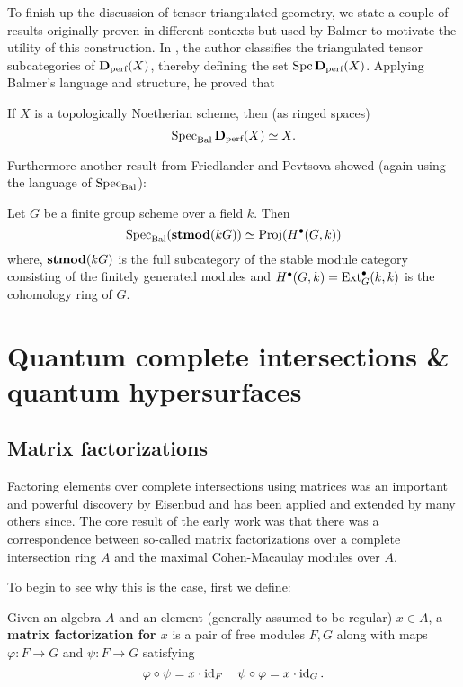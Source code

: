 \documentclass [11pt, proquest] {uwthesis}[2020/02/24]
\DeclareMathOperator{\Spc}{Spc}
\begin{document}
    To finish up the discussion of tensor-triangulated geometry, we state a couple of results originally proven in different contexts but used 
    by Balmer to motivate the utility of this construction. In \cite{thomason}, the author classifies the triangulated tensor subcategories 
    of $\mathbf{D}_{\text{perf}}(X)$, thereby defining the set $\Spc\Dperf(X)$. Applying Balmer's language and structure, he proved that 
    \begin{thm}
    	If $X$ is a topologically Noetherian scheme, then (as ringed spaces)
    	\[\operatorname{Spec}_\text{Bal}\mathbf{D}_{\text{perf}}(X)\simeq X.\]
    \end{thm}
    
    Furthermore another result from Friedlander and Pevtsova \cite{friedlander-pevtsova-pi} showed (again using 
    the language of $\operatorname{Spec}_\text{Bal}$):
    \begin{thm}
    	Let $G$ be a finite group scheme over a field $k$. Then 
    	\[\operatorname{Spec}_\text{Bal}(\operatorname{\mathbf{stmod}}(kG))\simeq\operatorname{Proj}(H^\bullet(G,k))\]
    	where, $\operatorname{\mathbf{stmod}}(kG)$ is the full subcategory of the stable module category consisting of the finitely generated modules and $H^\bullet(G,k)=\operatorname{Ext}_G^\bullet(k,k)$ is the cohomology ring of $G$.
    \end{thm}

\part{Quantum complete intersections \& quantum hypersurfaces}\label{prt:qci-qlp}

\chapter{Matrix factorizations}\label{chp:matrix-factorizations}
    Factoring elements over complete intersections using matrices was an important and powerful discovery by Eisenbud \cite{eisenbud80} and has been applied and extended by many others since. The core result of the early work was that there was a correspondence between so-called matrix factorizations over a complete intersection ring $A$ and the maximal Cohen-Macaulay modules over $A$. 
    
    To begin to see why this is the case, first we define:
    \begin{defn}
        Given an algebra $A$ and an element (generally assumed to be regular) $x\in A$, a \textbf{matrix factorization for $x$} is a pair of free modules $F, G$ along with maps $\varphi:F\to G$ and $\psi:F\to G$
        satisfying
        \[\varphi\circ\psi = x\cdot \operatorname{id}_F\quad \psi\circ\varphi=x\cdot \operatorname{id}_G.\]
    \end{defn}
\end{document}
